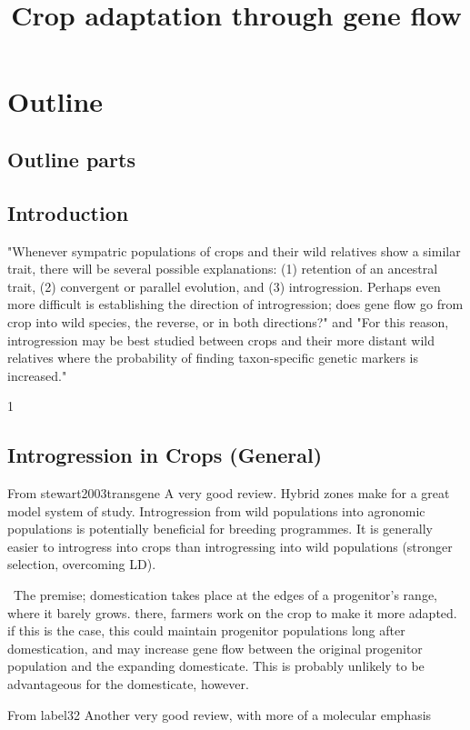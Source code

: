 \documentclass[11pt]{article}
\title{Crop adaptation through gene flow}
\begin{document}
\maketitle

\section*{Outline}
\subsection*{Outline parts}

\subsection*{Introduction}
 "Whenever sympatric populations of crops and their wild relatives show a similar trait, there will be several possible explanations: (1) retention of an ancestral trait, (2) convergent or parallel evolution, and (3) introgression.  Perhaps even more difficult is establishing the direction of introgression; does gene flow go from crop into wild species, the reverse, or in both directions?" and "For this reason, introgression may be best studied between crops and their more distant wild relatives where the probability of finding taxon-specific genetic markers is increased." \cite{doebley1990molecular}


1\subsection*{Introgression in Crops (General)}

From {stewart2003transgene}
A very good review.
Hybrid zones make for a great model system of study.
Introgression from wild populations into agronomic populations is potentially beneficial for breeding programmes.
It is generally easier to introgress into crops than introgressing into wild populations (stronger selection, overcoming LD).

\cite{harlan1966distribution}\ The premise; domestication takes place at the edges of a progenitor's range, where it barely grows.  there, farmers work on the crop to make it more adapted.  if this is the case, this could maintain progenitor populations long after domestication, and may increase gene flow between the original progenitor population and the expanding domesticate.  This is probably unlikely to be advantageous for the domesticate, however.

From {label32}
Another very good review, with more of a molecular emphasis
\end{document}
